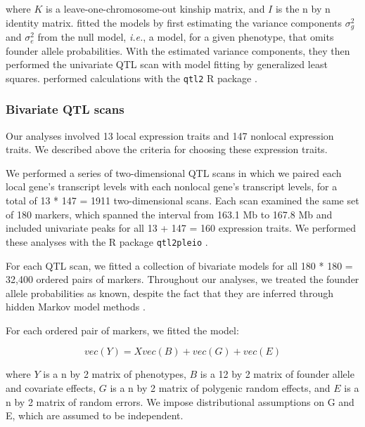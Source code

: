 \documentclass{article}
\begin{document}
where $K$ is a leave-one-chromosome-out kinship matrix, and $I$ is the n by n identity matrix. \citet{keller2018genetic} fitted the models by first estimating the variance components $\sigma^2_g$ and $\sigma^2_e$ from the null model, \emph{i.e.}, a model, for a given phenotype, that omits founder allele probabilities. With the estimated variance components, they then performed the univariate QTL scan with model fitting by generalized least squares. \citet{keller2018genetic} performed calculations with the \texttt{qtl2} R package \citep{Broman2018}.









\subsubsection{Bivariate QTL scans}

Our analyses involved 13 local expression traits and 147 nonlocal expression traits. We described above the criteria for choosing these expression traits.

We performed a series of two-dimensional QTL scans in which we paired each local gene's transcript levels with each nonlocal gene's transcript levels, for a total of 13 * 147 = 1911 two-dimensional scans. Each scan examined the same set of 180 markers, which spanned the interval from 163.1 Mb to 167.8 Mb and included univariate peaks for all 13 + 147 = 160 expression traits. We performed these analyses with the R package \texttt{qtl2pleio} \citep{qtl2pleio}.

For each QTL scan, we fitted a collection of bivariate models for all 180 * 180 = 32,400 ordered pairs of markers. Throughout our analyses, we treated the founder allele probabilities as known, despite the fact that they are inferred through hidden Markov model methods \citep{broman2012genotype, broman2012haplotype, Broman2018}. 

For each ordered pair of markers, we fitted the model:

\begin{equation}
    vec(Y) = Xvec(B) + vec(G) + vec(E)
    \label{eqn:bivariate-model}
\end{equation}

where $Y$ is a n by 2 matrix of phenotypes, $B$ is a 12 by 2 matrix of founder allele and covariate effects, $G$ is a n by 2 matrix of polygenic random effects, and $E$ is a n by 2 matrix of random errors. We impose distributional assumptions on G and E, which are assumed to be independent.
\end{document}

